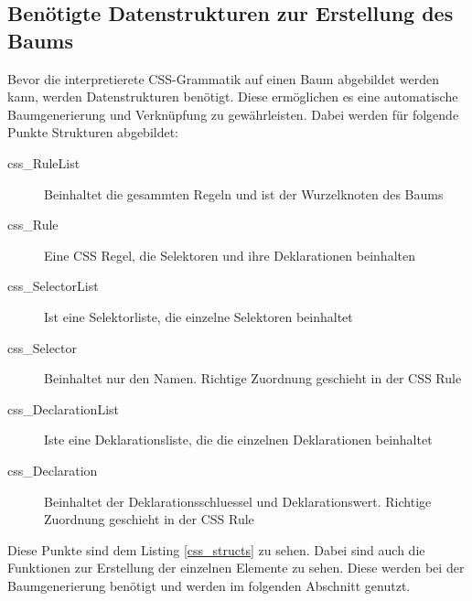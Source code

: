 \subsection{Benötigte Datenstrukturen zur Erstellung des Baums}
Bevor die interpretierete CSS-Grammatik auf einen Baum abgebildet werden kann, werden Datenstrukturen benötigt. Diese ermöglichen es eine automatische Baumgenerierung und Verknüpfung zu gewährleisten. Dabei werden für folgende Punkte Strukturen abgebildet:
\begin{description}
    \item[css\_RuleList] Beinhaltet die gesammten Regeln und ist der Wurzelknoten des Baums 

    \item[css\_Rule] Eine CSS Regel, die Selektoren und ihre Deklarationen beinhalten 

    \item[css\_SelectorList] Ist eine Selektorliste, die einzelne Selektoren beinhaltet 
    
    \item[css\_Selector] Beinhaltet nur den Namen. Richtige Zuordnung geschieht in der CSS Rule

    \item[css\_DeclarationList] Iste eine Deklarationsliste, die die einzelnen Deklarationen beinhaltet 

    \item[css\_Declaration] Beinhaltet der Deklarationsschluessel und Deklarationswert. Richtige Zuordnung geschieht in der CSS Rule 

\end{description}

Diese Punkte sind dem Listing \ref{css_structs} zu sehen. Dabei sind auch die Funktionen zur Erstellung der einzelnen Elemente zu sehen. Diese werden bei der Baumgenerierung benötigt und werden im folgenden Abschnitt genutzt.

